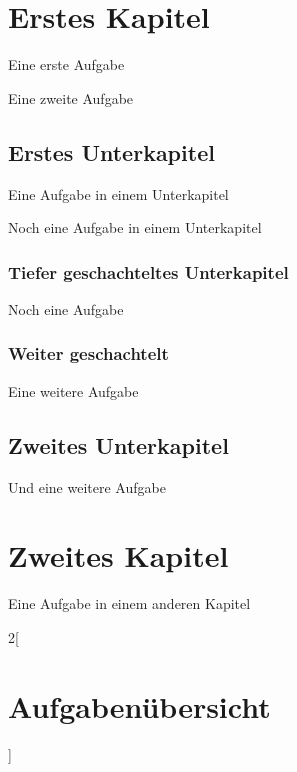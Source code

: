 \documentclass{article}
\newif\iflist
\begin{document}
\section{Erstes Kapitel}
\begin{exercise}
  Eine erste Aufgabe
\end{exercise}
\begin{exercise}
  Eine zweite Aufgabe
\end{exercise}

\subsection{Erstes Unterkapitel}
\begin{exercise}
  Eine Aufgabe in einem Unterkapitel
\end{exercise}
\begin{exercise}
  Noch eine Aufgabe in einem Unterkapitel
\end{exercise}

\subsubsection{Tiefer geschachteltes Unterkapitel}
\begin{exercise}
  Noch eine Aufgabe
\end{exercise}

\subsubsection{Weiter geschachtelt}
\begin{exercise}
  Eine weitere Aufgabe
\end{exercise}

\subsection{Zweites Unterkapitel}
\begin{exercise}
  Und eine weitere Aufgabe
\end{exercise}

\clearpage

\section{Zweites Kapitel}
\begin{exercise}
  Eine Aufgabe in einem anderen Kapitel
\end{exercise}

\begin{multicols}{2}[\section{Aufgabenübersicht}]
  \listtrue
\end{multicols}
\end{document}
